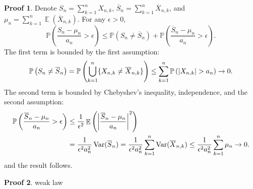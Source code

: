 \documentclass[hidelinks,11pt]{article}
\theoremstyle{definition}
\theoremstyle{dotless}
\newtheorem{prop}{Proof}[section]
\theoremstyle{remark}
\DeclareMathOperator{\Var}{Var}
\DeclareMathOperator{\E}{\mathbb{E}}
\DeclareMathOperator{\1}{\mathbf{1}}
\begin{document}
\begin{prop}
Denote $S_n=\sum_{k=1}^nX_{n,k}$, $\overline{S}_n=\sum_{k=1}^n\overline{X}_{n,k}$, and $\mu_n=\sum_{k=1}^n\E(\overline{X}_{n,k})$. For any $\epsilon>0$,
\[\mathbb{P}\left({\frac{S_n-\mu_n}{a_n}}>\epsilon\right)\leq\mathbb{P}(S_n\neq\overline{S}_n)+\mathbb{P}\left({\frac{\overline{S}_n-\mu_n}{a_n}}>\epsilon\right).\]
The first term is bounded by the first assumption:
\[\mathbb{P}\left(S_n\neq\overline{S}_n\right)=\mathbb{P}\left(\bigcup_{k=1}^n\{X_{n,k}\neq\overline{X}_{n,k}\}\right)\leq\sum_{k=1}^n\mathbb{P}\left(\abs{X_{n,k}}>a_n\right)\to0.\]
The second term is bounded by Chebyshev's inequality, independence, and the second assumption:
\begin{align*}
\mathbb{P}\left({\frac{\overline{S}_n-\mu_n}{a_n}}>\epsilon\right)&\leq\frac{1}{\epsilon^2}\E\left(\abs{\frac{\overline{S}_n-\mu_n}{a_n}}^2\right)\\
&=\frac{1}{\epsilon^2a_n^2}\Var(\overline{S}_n)=\frac{1}{\epsilon^2a_n^2}\sum_{k=1}^n\Var(\overline{X}_{n,k})\leq\frac{1}{\epsilon^2a_n^2}\sum_{k=1}^n\mu_n\to0.
\end{align*}
and the result follows.
\end{prop}

\begin{prop}
weak law
\end{prop}
\end{document}
